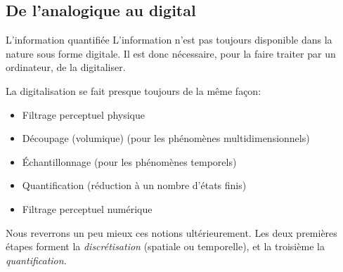 \subsection{De l'analogique au digital}
\begin{frame}{L'information quantifiée}
  L'information n'est pas toujours disponible dans la nature sous forme
  digitale. Il est donc nécessaire, pour la faire traiter par un
  ordinateur, de la digitaliser.
  
  La digitalisation se fait presque toujours de la même façon:
  \begin{itemize}
  \item Filtrage perceptuel physique
  \item Découpage (volumique) (pour les phénomènes multidimensionnels)
  \item Échantillonnage (pour les phénomènes temporels)
  \item Quantification (réduction à un nombre d'états finis)
  \item Filtrage perceptuel numérique
  \end{itemize}

  Nous reverrons un peu mieux ces notions ultérieurement. Les deux
  premières étapes forment la \emph{discrétisation} (spatiale ou
  temporelle), et la troisième la \emph{quantification}.
\end{frame}
